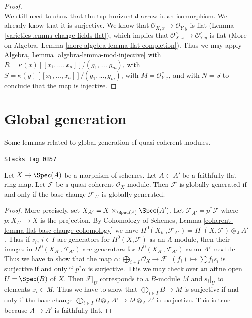 \begin{proof}
$$$$
We still need to show that the top horizontal arrow is an isomorphism.
We already know that it is surjective. We know that
$\mathcal{O}_{X, x} \to \mathcal{O}_{Y, y}$ is flat
(Lemma \ref{varieties-lemma-change-fields-flat}), which implies that
$\mathcal{O}_{X, x}^\wedge \to \mathcal{O}_{Y, y}^\wedge$ is flat
(More on Algebra, Lemma \ref{more-algebra-lemma-flat-completion}).
Thus we may apply Algebra, Lemma \ref{algebra-lemma-mod-injective}
with $R = \kappa(x)[[x_1, \ldots, x_n]]/(g_1, \ldots, g_m)$,
with $S = \kappa(y)[[x_1, \ldots, x_n]]/(g_1, \ldots, g_m)$,
with $M = \mathcal{O}_{Y, y}^\wedge$, and with $N = S$
to conclude that the map is injective.
\end{proof}

\section{Global generation}
\label{varieties-section-global-generation}
Some lemmas related to global generation of quasi-coherent modules.

\begin{lemma}
\label{varieties-lemma-globally-generated-base-change}
\href{https://stacks.math.columbia.edu/tag/0B57}{\texttt{Stacks tag 0B57}}

Let $X \to \Spec(A)$ be a morphism of schemes. Let $A \subset A'$
be a faithfully flat ring map. Let $\mathcal{F}$ be a quasi-coherent
$\mathcal{O}_X$-module. Then $\mathcal{F}$ is globally generated
if and only if the base change $\mathcal{F}_{A'}$ is globally generated.
\end{lemma}

\begin{proof}
More precisely, set $X_{A'} = X \times_{\Spec(A)} \Spec(A')$.
Let $\mathcal{F}_{A'} = p^*\mathcal{F}$ where $p : X_{A'} \to X$
is the projection. By
Cohomology of Schemes, Lemma \ref{coherent-lemma-flat-base-change-cohomology}
we have
$H^0(X_{k'}, \mathcal{F}_{A'}) = H^0(X, \mathcal{F}) \otimes_A A'$.
Thus if $s_i$, $i \in I$ are generators for $H^0(X, \mathcal{F})$
as an $A$-module, then their images in $H^0(X_{A'}, \mathcal{F}_{A'})$
are generators for $H^0(X_{A'}, \mathcal{F}_{A'})$ as an $A'$-module.
Thus we have to show that the map
$\alpha : \bigoplus_{i \in I} \mathcal{O}_X \to \mathcal{F}$,
$(f_i) \mapsto \sum f_i s_i$
is surjective if and only if $p^*\alpha$ is surjective.
This we may check over an affine open $U = \Spec(B)$ of $X$.
Then $\mathcal{F}|_U$ corresponds to a $B$-module $M$
and $s_i|_U$ to elements $x_i \in M$. Thus we have to show
that $\bigoplus_{i \in I} B \to M$ is surjective if and only
if the base change $\bigoplus_{i \in I} B \otimes_A A' \to M \otimes_A A'$
is surjective. This is true because $A \to A'$ is faithfully flat.
\end{proof}

